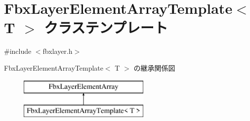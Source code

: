 \hypertarget{class_fbx_layer_element_array_template}{}\section{Fbx\+Layer\+Element\+Array\+Template$<$ T $>$ クラステンプレート}
\label{class_fbx_layer_element_array_template}


{\ttfamily \#include $<$fbxlayer.\+h$>$}

Fbx\+Layer\+Element\+Array\+Template$<$ T $>$ の継承関係図\begin{figure}[H]
\begin{center}
\leavevmode
\includegraphics[height=2.000000cm]{class_fbx_layer_element_array_template}
\end{center}
\end{figure}
